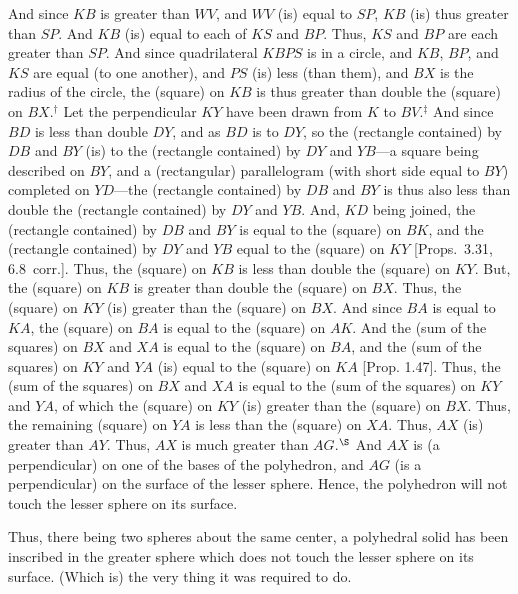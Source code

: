 \begin{Parallel}{}{}
{And since $KB$ is greater than $WV$, and $WV$ (is) equal to $SP$, $KB$ (is) thus greater than
$SP$. And $KB$ (is) equal to each of $KS$ and $BP$. Thus, $KS$ and $BP$ are each greater than $SP$. 
And since quadrilateral $KBPS$ is in a circle, and $KB$, $BP$, and $KS$ are equal (to one another), and $PS$ (is) less (than them),
and $BX$ is the radius of the circle, the (square) on $KB$ is thus greater than
double the (square) on $BX$.$^\dag$
Let the perpendicular  $KY$ have been drawn from $K$ to $BV$.$^\ddag$ And since $BD$ is less than double
$DY$, and as $BD$ is to $DY$, so the (rectangle contained) by $DB$ and $BY$ (is) to the (rectangle contained) by $DY$
and $YB$---a square being described on $BY$, and a (rectangular) parallelogram (with short side equal to $BY$) completed on $YD$---the (rectangle contained) by $DB$ and $BY$ is thus also less than double the (rectangle contained) by $DY$ and $YB$.
And, $KD$ being joined, the (rectangle contained) by $DB$ and $BY$ is equal to the (square) on $BK$, and the
(rectangle contained) by $DY$ and $YB$ equal to the (square) on $KY$ [Props.~3.31, 6.8~corr.]. Thus, the (square) on $KB$ is  less than double the (square) on $KY$. But, the (square) on $KB$ is greater than
double the (square) on $BX$. 
Thus, the (square) on $KY$ (is) greater than the (square) on $BX$.  And since $BA$ is equal to $KA$, the (square) on $BA$ is
equal to the (square) on $AK$. And the (sum of the squares) on $BX$ and $XA$ is equal to the (square) on $BA$, and
the (sum of the squares) on $KY$ and $YA$ (is) equal to the (square) on 
$KA$   [Prop. 1.47]. 
Thus, the (sum of the squares) on $BX$ and $XA$ is equal to the (sum of the squares) on $KY$ and $YA$, of
which the (square) on $KY$ (is) greater than the (square) on $BX$. Thus, the remaining (square) on $YA$ is less than the
(square) on $XA$. Thus, $AX$ (is) greater than $AY$. Thus, $AX$ is much greater than $AG$.$^\S$ And $AX$ is (a perpendicular) on one of the bases of the
polyhedron, and $AG$ (is a perpendicular) on the surface of the lesser sphere. Hence, the polyhedron will not touch the lesser sphere on its
surface.

Thus, there being two spheres about the same center, a polyhedral solid has been inscribed in the greater sphere which does not
touch the lesser sphere on its surface. (Which is) the very thing it was required to do.}
\end{Parallel}


~\\

